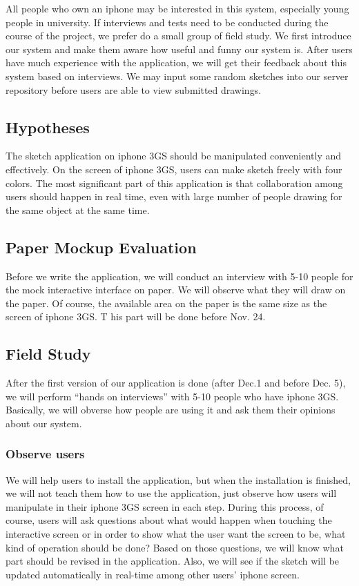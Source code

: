 \documentclass{article}
\begin{document}
All people who own an iphone may be interested in this system, especially young
people in university. If interviews and tests need to be conducted during the
course of the project, we prefer do a small group of field study. We first
introduce our system and make them aware how useful and funny our system is.
After users have much experience with the application, we will get their
feedback about this system based on interviews. We may input some random
sketches into our server repository before users are able to view submitted
drawings.

\subsection{Hypotheses}

The sketch application on iphone 3GS should be manipulated conveniently and
effectively. On the screen of iphone 3GS, users can make sketch freely with
four colors. The most significant part of this application is that
collaboration among  users should happen in real time, even with large number
of people drawing for the same object at the same time.

\subsection{Paper Mockup Evaluation}

Before we write the application, we will conduct an interview with 5-10 people
for the mock interactive interface on paper. We will observe what they will
draw on the paper. Of course, the available area on the paper is the same size
as the screen of iphone 3GS. T his part will be done before Nov. 24.

\subsection{Field Study}

After the first version of our application is done (after Dec.1 and before Dec.
5), we will perform ``hands on interviews'' with 5-10 people who have iphone
3GS.  Basically, we will obverse how people are using it and ask them their
opinions about our system.

\subsubsection{Observe users}

We will help users to install the application, but when the installation is
finished, we will not teach them how to use the application, just observe how
users will manipulate in their iphone 3GS screen in each step. During this
process, of course, users will ask questions about what would happen when
touching the interactive screen or in order to show what the user want the
screen to be, what kind of operation should be done? Based on those questions,
we will know what part should be revised in the application. Also, we will see
if the sketch will be updated automatically in real-time among other users'
iphone screen.
\end{document}
